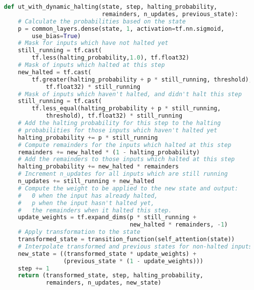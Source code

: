 \begin{lstlisting}[language=Python, caption=Computations in each step of the UT with dynamic halting.]
def ut_with_dynamic_halting(state, step, halting_probability, 
                            remainders, n_updates, previous_state):
    # Calculate the probabilities based on the state 
    p = common_layers.dense(state, 1, activation=tf.nn.sigmoid, 
        use_bias=True)
    # Mask for inputs which have not halted yet
    still_running = tf.cast(
        tf.less(halting_probability,1.0), tf.float32)
    # Mask of inputs which halted at this step
    new_halted = tf.cast(
        tf.greater(halting_probability + p * still_running, threshold), 
            tf.float32) * still_running
    # Mask of inputs which haven't halted, and didn't halt this step
    still_running = tf.cast(
        tf.less_equal(halting_probability + p * still_running, 
            threshold), tf.float32) * still_running
    # Add the halting probability for this step to the halting
    # probabilities for those inputs which haven't halted yet
    halting_probability += p * still_running
    # Compute remainders for the inputs which halted at this step
    remainders += new_halted * (1 - halting_probability)
    # Add the remainders to those inputs which halted at this step
    halting_probability += new_halted * remainders
    # Increment n_updates for all inputs which are still running
    n_updates += still_running + new_halted
    # Compute the weight to be applied to the new state and output:
    #   0 when the input has already halted,
    #   p when the input hasn't halted yet,
    #   the remainders when it halted this step.
    update_weights = tf.expand_dims(p * still_running +
                                    new_halted * remainders, -1)
    # Apply transformation to the state
    transformed_state = transition_function(self_attention(state))
    # Interpolate transformed and previous states for non-halted inputs
    new_state = ((transformed_state * update_weights) +
                 (previous_state * (1 - update_weights)))
    step += 1
    return (transformed_state, step, halting_probability,
            remainders, n_updates, new_state)
\end{lstlisting}